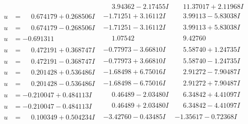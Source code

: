 \documentclass[1p]{elsarticle_modified}
\theoremstyle{definition}
\begin{document}
$$\begin{array}{c|c|c}
 & \phantom{-}3.94362 - 2.17455 I & \phantom{-}11.37017 + 2.11968 I \\ \hline\begin{aligned}
u &= \phantom{-}0.674179 + 0.268506 I\end{aligned}
 & -1.71251 + 3.16112 I & \phantom{-}3.99113 - 5.83038 I \\ \hline\begin{aligned}
u &= \phantom{-}0.674179 - 0.268506 I\end{aligned}
 & -1.71251 - 3.16112 I & \phantom{-}3.99113 + 5.83038 I \\ \hline\begin{aligned}
u &= -0.691311\phantom{ +0.000000I}\end{aligned}
 & \phantom{-}1.07542\phantom{ +0.000000I} & \phantom{-}9.42760\phantom{ +0.000000I} \\ \hline\begin{aligned}
u &= \phantom{-}0.472191 + 0.368747 I\end{aligned}
 & -0.77973 - 3.66810 I & \phantom{-}5.58740 + 1.24735 I \\ \hline\begin{aligned}
u &= \phantom{-}0.472191 - 0.368747 I\end{aligned}
 & -0.77973 + 3.66810 I & \phantom{-}5.58740 - 1.24735 I \\ \hline\begin{aligned}
u &= \phantom{-}0.201428 + 0.536486 I\end{aligned}
 & -1.68498 + 6.75016 I & \phantom{-}2.91272 - 7.90487 I \\ \hline\begin{aligned}
u &= \phantom{-}0.201428 - 0.536486 I\end{aligned}
 & -1.68498 - 6.75016 I & \phantom{-}2.91272 + 7.90487 I \\ \hline\begin{aligned}
u &= -0.210047 + 0.484113 I\end{aligned}
 & \phantom{-}0.46489 - 2.03480 I & \phantom{-}6.34842 + 4.41097 I \\ \hline\begin{aligned}
u &= -0.210047 - 0.484113 I\end{aligned}
 & \phantom{-}0.46489 + 2.03480 I & \phantom{-}6.34842 - 4.41097 I \\ \hline\begin{aligned}
u &= \phantom{-}0.100349 + 0.504234 I\end{aligned}
 & -3.42760 - 0.43485 I & -1.35617 - 0.72368 I \\ \hline\begin{aligned}

\end{aligned}
\end{array}$$
\end{document}
